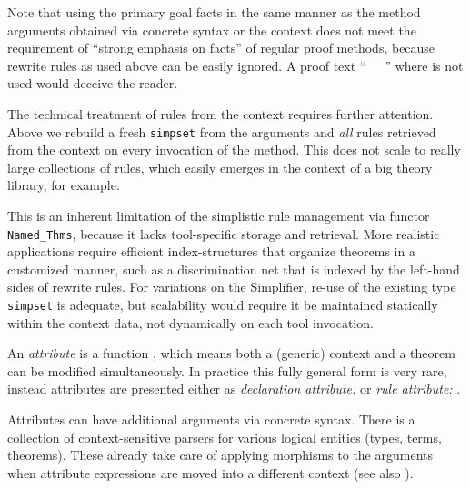 \begin{isabellebody}
\begin{isamarkuptext}
  Note that using the primary goal facts in the same manner as the
  method arguments obtained via concrete syntax or the context does
  not meet the requirement of ``strong emphasis on facts'' of regular
  proof methods, because rewrite rules as used above can be easily
  ignored.  A proof text ``\hyperlink{command.using}{\mbox{}}~~\hyperlink{command.by}{\mbox{}}~'' where  is not used would
  deceive the reader.

  \medskip The technical treatment of rules from the context requires
  further attention.  Above we rebuild a fresh \verb|simpset| from
  the arguments and \emph{all} rules retrieved from the context on
  every invocation of the method.  This does not scale to really large
  collections of rules, which easily emerges in the context of a big
  theory library, for example.

  This is an inherent limitation of the simplistic rule management via
  functor \verb|Named_Thms|, because it lacks tool-specific
  storage and retrieval.  More realistic applications require
  efficient index-structures that organize theorems in a customized
  manner, such as a discrimination net that is indexed by the
  left-hand sides of rewrite rules.  For variations on the Simplifier,
  re-use of the existing type \verb|simpset| is adequate, but
  scalability would require it be maintained statically within the
  context data, not dynamically on each tool invocation.%
\end{isamarkuptext}%
\isamarkuptrue%
%
\isamarkuptrue%
%
\begin{isamarkuptext}%
An \emph{attribute} is a function , which means both a (generic) context and a theorem
  can be modified simultaneously.  In practice this fully general form
  is very rare, instead attributes are presented either as
  \emph{declaration attribute:}  or
  \emph{rule attribute:} .

  Attributes can have additional arguments via concrete syntax.  There
  is a collection of context-sensitive parsers for various logical
  entities (types, terms, theorems).  These already take care of
  applying morphisms to the arguments when attribute expressions are
  moved into a different context (see also ).


\end{isamarkuptext}
\end{isabellebody}
